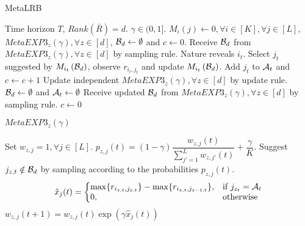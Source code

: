 %
%
%



\begin{algorithm}[!th]
\caption{MetaLRB}
\label{alg:mLRB}
\begin{algorithmic}[1]
 Time horizon $T$, $Rank(\bar{R}) = d$.
 $\gamma \in (0,1]$.
 $M_{i}\left( j\right) \leftarrow 0, \forall i\in [K], \forall j\in [L]$,  $MetaEXP3_{z}(\gamma),\forall z\in[d]$, $\mathcal{B}_d\leftarrow \emptyset$ and $c\leftarrow 0$.
\State Receive $\mathcal{B}_d$ from $MetaEXP3_z(\gamma),\forall z\in[d]$ by sampling rule.
\State Nature reveals $i_t$.  
\State Select $j_t$ suggested by $M_{i_t}\left( \mathcal{B}_d \right)$, observe $r_{i_t,j_t}$ and update $M_{i_t}\left( \mathcal{B}_d \right)$. 
\State Add $j_t$ to $\mathcal{A}_t$ and $c\leftarrow c + 1$
 
\State Update independent $MetaEXP3_{z}(\gamma),\forall z\in[d]$ by update rule.
\State $\mathcal{B}_d\leftarrow \emptyset$ and $\mathcal{A}_t\leftarrow\emptyset$
\State Receive updated $\mathcal{B}_d$ from $MetaEXP3_z(\gamma),\forall z\in[d]$ by sampling rule.
\State $c\leftarrow 0$
\EndIf
\EndFor
\end{algorithmic}
\end{algorithm}


\begin{algorithm}[!th]
\caption{$MetaEXP3_{z}(\gamma)$}
\label{alg:mEXP3}
\begin{algorithmic}[1]
 Set $w_{z,j} = 1, \forall j\in [L]$.
\State $p_{z,j}(t) = \left( 1 - \gamma \right)\dfrac{w_{z,j}(t)}{\sum_{j'=1}^{L}w_{z,j'}(t)} + \dfrac{\gamma}{K}$.
\EndFor
\State Suggest $j_{z,t} \notin \mathcal{B}_d$ by sampling according to the probabilities $p_{z,j}(t)$.
\State \begin{equation}
  \hat{x}_j(t)=\left\{
  \begin{array}{@{}ll@{}}
    \max\lbrace r_{i_{z,t},j_{z,t}}\rbrace - \max\lbrace r_{i_{z,t},j_{z-1,t}}\rbrace, & \text{if}\ j_{z_t} = \A_t \\
    0, & \text{otherwise}
  \end{array}\right.
\end{equation} 
\State $w_{z,j}(t+1) = w_{z,j}(t)\exp\left( \gamma \hat{x}_j(t)\right)$
\EndFor
\end{algorithmic}
\end{algorithm}

